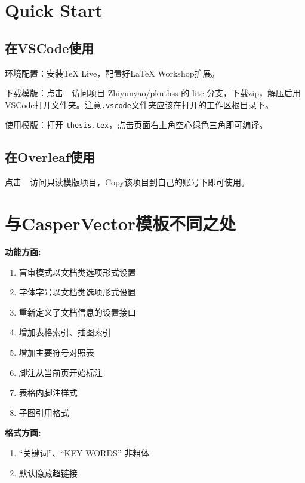 \section{Quick Start}

\subsection{在VSCode使用}
环境配置：安装TeX Live，配置好LaTeX Workshop扩展。

下载模版：点击\ \GitHubLink\ 访问项目 Zhiyunyao/pkuthss 的 lite 分支，下载zip，解压后用VSCode打开文件夹。注意\verb|.vscode|文件夹应该在打开的工作区根目录下。

使用模版：打开 \verb|thesis.tex|，点击页面右上角空心绿色三角即可编译。

\subsection{在Overleaf使用}
点击\ \OverleafLink\ 访问只读模版项目，Copy该项目到自己的账号下即可使用。

\section{与CasperVector模板不同之处}

\textbf{功能方面:}

\begin{enumerate}[leftmargin=5em]
    \item 盲审模式以文档类选项形式设置
    \item 字体字号以文档类选项形式设置
    \item 重新定义了文档信息的设置接口
    \item 增加表格索引、插图索引
    \item 增加主要符号对照表
    \item 脚注从当前页开始标注
    \item 表格内脚注样式
    \item 子图引用格式
\end{enumerate}

\textbf{格式方面:}

\begin{enumerate}[leftmargin=5em]
    \item ``关键词”、``KEY WORDS” 非粗体 
    \item 默认隐藏超链接
\end{enumerate}

